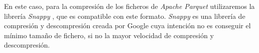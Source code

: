 En este caso, para la compresión de los ficheros de \textit{Apache Parquet} utilizaremos la librería \textit{Snappy} \cite{snappyLib}, que es compatible con este formato. \textit{Snappy} es una librería de compresión y descompresión creada por Google cuya intención no es conseguir el mínimo tamaño de fichero, si no la mayor velocidad de compresión y descompresión.